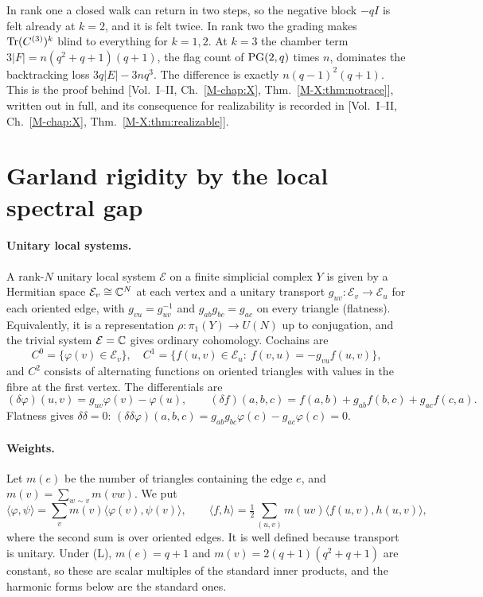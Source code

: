 \begin{remark}\label{V3P1:rem:parity}
In rank one a closed walk can return in two steps, so the negative block $-qI$ is felt
already at $k=2$, and it is felt twice. In rank two the grading makes $\operatorname{Tr}(C^{(3)})^{k}$
blind to everything for $k=1,2$. At $k=3$ the chamber term $3|F|=n(q^{2}+q+1)(q+1)$, the flag
count of $\mathrm{PG}(2,q)$ times $n$, dominates the backtracking loss $3q|E|-3nq^{3}$. The
difference is exactly $n(q-1)^{2}(q+1)$. This is the proof behind
[Vol.~I--II, Ch.~\ref{M-chap:X}, Thm.~\ref{M-X:thm:notrace}], written out in full, and its consequence for
realizability is recorded in [Vol.~I--II, Ch.~\ref{M-chap:X}, Thm.~\ref{M-X:thm:realizable}].
\end{remark}



\section{Garland rigidity by the local spectral gap}\label{V3P1:sec:garland}

\paragraph{Unitary local systems.} A rank-$N$ unitary local system $\mathcal E$ on a finite
simplicial complex $Y$ is given by a Hermitian space $\mathcal E_v\cong\mathbb{C}^{N}$ at each vertex
and a unitary transport $g_{uv}\colon\mathcal E_v\to\mathcal E_u$ for each oriented edge, with
$g_{vu}=g_{uv}^{-1}$ and $g_{ab}g_{bc}=g_{ac}$ on every triangle (flatness). Equivalently, it
is a representation $\rho\colon\pi_1(Y)\to U(N)$ up to conjugation, and the trivial system
$\mathcal E=\mathbb{C}$ gives ordinary cohomology. Cochains are
\[
C^{0}=\{\varphi(v)\in\mathcal E_v\},\quad
C^{1}=\{f(u,v)\in\mathcal E_u:\ f(v,u)=-g_{vu}f(u,v)\},
\]
and $C^{2}$ consists of alternating functions on oriented triangles with values in the fibre
at the first vertex. The differentials are
\[
(\delta\varphi)(u,v)=g_{uv}\varphi(v)-\varphi(u),\qquad
(\delta f)(a,b,c)=f(a,b)+g_{ab}f(b,c)+g_{ac}f(c,a).
\]
Flatness gives $\delta\delta=0$:
$(\delta\delta\varphi)(a,b,c)=g_{ab}g_{bc}\varphi(c)-g_{ac}\varphi(c)=0$.

\paragraph{Weights.} Let $m(e)$ be the number of triangles containing the edge $e$, and
$m(v)=\sum_{w\sim v}m(vw)$. We put
\[
\langle\varphi,\psi\rangle=\sum_vm(v)\langle\varphi(v),\psi(v)\rangle,\qquad
\langle f,h\rangle=\tfrac12\sum_{(u,v)}m(uv)\langle f(u,v),h(u,v)\rangle,
\]
where the second sum is over oriented edges. It is well defined because transport is unitary.
Under (L), $m(e)=q+1$ and $m(v)=2(q+1)(q^{2}+q+1)$ are constant, so these are scalar multiples
of the standard inner products, and the harmonic forms below are the standard ones.

